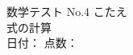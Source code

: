 \documentclass[a4paper,14pt]{article}  %
\begin{document}
\begin{tcolorbox}[
  colback=myblue!5,     %
  colframe=myblue,      %
  boxrule=1pt,
  arc=3mm,
  width=\textwidth
]

\begin{center}                                               %
{\Large  \textcolor{myblue}{数学テスト No.4 こたえ}}\\[0.4em]         %
{  式の計算}\\[0.8em]               %
\textcolor{myred}{日付：\underline{\hspace{3cm}} \hfill 点数：\underline{\hspace{2cm}}}
\end{center}
\end{tcolorbox}

\vspace{1em}  %


\end{document}
